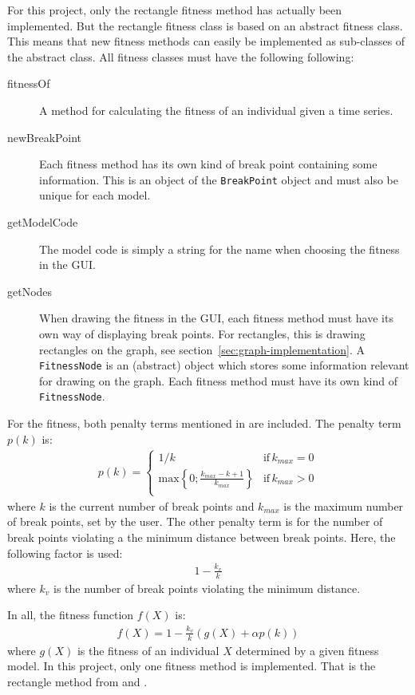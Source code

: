 For this project, only the rectangle fitness method has actually been
implemented. But the rectangle fitness class is based on an abstract fitness
class. This means that new fitness methods can easily be implemented as
sub-classes of the abstract class. All fitness classes must have the following
following: 
\begin{description}
    \item[fitnessOf] A method for calculating the fitness of an individual given
    a time series. 
    \item[newBreakPoint] Each fitness method has its own kind of break point
    containing some information. This is an object of the \texttt{BreakPoint}
    object and must also be unique for each model. 
    \item[getModelCode] The model code is simply a string for the name when
    choosing the fitness in the GUI. 
    \item[getNodes] When drawing the fitness in the GUI, each fitness method
    must have its own way of displaying break points. For rectangles, this is
    drawing rectangles on the graph, see section~\ref{sec:graph-implementation}.
    A \texttt{FitnessNode} is an (abstract) object which stores some information
    relevant for drawing on the graph. Each fitness method must have its own
    kind of \texttt{FitnessNode}. 
\end{description}

For the fitness, both penalty terms mentioned in \cite{doerr2017a} are included.
The penalty term $p(k)$ is:
\begin{align}
    p(k) = \begin{cases}
        1/k & \text{if} \, k_{max} = 0 \\
        \text{max} \left \{ 0;\frac{k_{max} - k + 1}{k_{max}} \right \} & \text{if} \, k_{max} > 0 \\
    \end{cases}
\end{align}
where $k$ is the current number of break points and $k_{max}$ is the maximum
number of break points, set by the user. The other penalty term is for the
number of break points violating a the minimum distance between break points.
Here, the following factor is used:
\begin{align}
    1 - \frac{k_v}{k}
\end{align}
where $k_v$ is the number of break points violating the minimum distance. 

In all, the fitness function $f(X)$ is:
\begin{align}
    f(X) = 1 - \frac{k_v}{k} (g(X) + \alpha p(k))
\end{align}
where $g(X)$ is the fitness of an individual $X$ determined by a given fitness
model. In this project, only one fitness method is implemented. That is the
rectangle method from \cite{doerr2017a} and \cite{compstat14}. 


